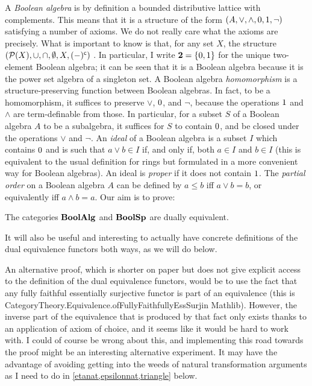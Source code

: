 A \emph{Boolean algebra} is by definition a bounded distributive lattice with
complements. This means that it is a structure of the form $(A, \vee, \wedge,
0, 1, \neg)$ satisfying a number of axioms. We do not really care what
the axioms are precisely. What is important to know is that, for any set $X$,
the structure $(\mathcal{P}(X), \cup, \cap, \emptyset, X, (-)^{\mathsf{c}})$
.
In particular, I write $\mathbf{2} = \{ 0, 1 \}$ for the unique two-element
Boolean algebra; it can be seen that it is a Boolean algebra because it is the
power set algebra of a singleton set. A Boolean algebra \emph{homomorphism} is
a structure-preserving function between Boolean algebras. In fact, to be a
homomorphism, it suffices to preserve $\vee$, $0$, and $\neg$, because the
operations $1$ and $\wedge$ are term-definable from those. In particular,
for a subset $S$ of a Boolean algebra $A$ to be a subalgebra, it suffices for
$S$ to contain $0$, and be closed under the operations $\vee$ and $\neg$. An
\emph{ideal} of a Boolean algebra is a subset $I$ which contains $0$ and is
such that $a \vee b \in I$ if, and only if, both $a \in I$ and $b \in I$ (this
is equivalent to the usual definition for rings but formulated in a more
convenient way for Boolean algebras). An ideal is \emph{proper} if it does not
contain $1$. The \emph{partial order} on a Boolean algebra $A$ can be
defined by $a \leq b$ iff $a \vee b = b$, or equivalently  iff $a \wedge b =
a$. Our aim is to prove:
\begin{theorem}
    \label{BABoolSpdualeq} 
    The categories $\mathbf{BoolAlg}$ and $\mathbf{BoolSp}$ are dually equivalent.
\end{theorem}
It will also be useful and interesting to actually have concrete definitions of
the dual equivalence functors both ways, as we will do below. 
\begin{remark}
An alternative proof, which is shorter on paper but does not give explicit
access to the definition of the dual equivalence functors, would be to use the
fact that any fully faithful essentially surjective functor is part of an
equivalence (this is 
{CategoryTheory.Equivalence.ofFullyFaithfullyEssSurj}{in Mathlib}). However,
the inverse part of the equivalence that is produced by that fact only exists
thanks to an application of axiom of choice, and it seems like it would be hard
to work with. I could of course be wrong about this, and implementing this road
towards the proof might be an interesting alternative experiment. It may have
the advantage of avoiding getting into the weeds of natural transformation
arguments as I need to do in \cref{etanat,epsilonnat,triangle} below.
\end{remark}

